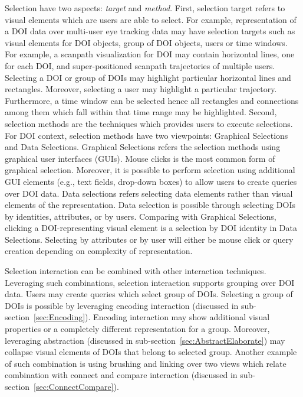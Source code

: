 Selection have two aspects: \textit{target} and \textit{method}. First, selection target refers to visual elements which are users are able to select. For example, representation of a DOI data over multi-user eye tracking data may have selection targets such as visual elements for DOI objects, group of DOI objects, users or time windows. For example, a scanpath visualization for DOI may contain horizontal lines, one for each DOI, and super-positioned scanpath trajectories of multiple users. Selecting a DOI or group of DOIs may highlight particular horizontal lines and rectangles. Moreover, selecting a user may highlight a particular trajectory. Furthermore, a time window can be selected hence all rectangles and connections among them which fall within that time range may be highlighted. Second, selection methods are the techniques which provides users to execute selections. For DOI context, selection methods have two viewpoints: Graphical Selections and Data Selections. Graphical Selections refers the selection methods using graphical user interfaces (GUIs). Mouse clicks is the most common form of graphical selection. Moreover, it is possible to perform selection using additional GUI elements (e.g., text fields, drop-down boxes) to allow users to create queries over DOI data. Data selections refers selecting data elements rather than visual elements of the representation. Data selection is possible through selecting DOIs by identities, attributes, or by users.  Comparing with Graphical Selections, clicking a DOI-representing visual element is a selection by DOI identity in Data Selections. Selecting by attributes or by user will either be mouse click or query creation depending on complexity of representation.
 
Selection interaction can be combined with other interaction techniques. Leveraging such combinations, selection interaction supports grouping over DOI data. Users may create queries which select group of DOIs. Selecting a group of DOIs is possible by leveraging encoding interaction (discussed in sub-section~\ref{sec:Encoding}). Encoding interaction may show additional visual properties or a completely different representation for a group. Moreover, leveraging abstraction (discussed in sub-section~\ref{sec:AbstractElaborate}) may collapse visual elements of DOIs that belong to selected group. Another example of such combination is using brushing and linking over two views which relate combination with connect and compare interaction (discussed in sub-section~\ref{sec:ConnectCompare}). 
	
